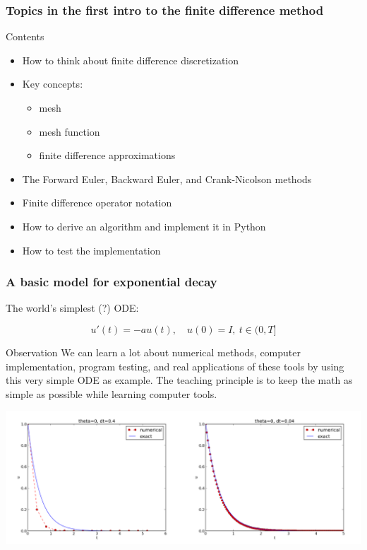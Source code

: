 \documentclass{beamer}
\begin{document}
\begin{frame}
\frametitle{Topics in the first intro to the finite difference method}

\begin{block}{Contents }
\begin{itemize}
 \item How to think about finite difference discretization

 \item Key concepts:
\begin{itemize}

   \item mesh

   \item mesh function

   \item finite difference approximations

\end{itemize}

\noindent
 \item The Forward Euler, Backward Euler, and Crank-Nicolson methods

 \item Finite difference operator notation

 \item How to derive an algorithm and implement it in Python

 \item How to test the implementation
\end{itemize}

\noindent
\end{block}
\end{frame}

\begin{frame}
\frametitle{A basic model for exponential decay}

\label{decay:model}

 

The world's simplest (?) ODE:

\begin{equation*}
u'(t) = -au(t),\quad u(0)=I,\ t\in (0,T]
\end{equation*}

\begin{block}{Observation }
We can learn a lot about numerical methods, computer implementation,
program testing, and real applications of these tools by using
this very simple ODE as example. The teaching principle is to keep the math as
simple as possible while learning computer tools.
\end{block}



\centerline{\includegraphics[width=0.7\linewidth]{fig-alg/FE1.png}}
\end{frame}
\end{document}
